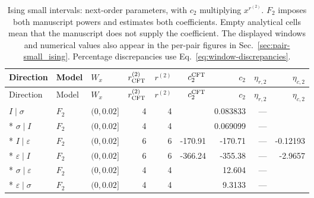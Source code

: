 \begingroup\setlength{\tabcolsep}{2pt}
\begin{longtable}{lllrrrrrr}
\caption{Ising small intervals: next-order parameters, with $c_2$ multiplying $x^{r^{(2)}}$. $F_2$ imposes both manuscript powers and estimates both coefficients. Empty analytical cells mean that the manuscript does not supply the coefficient. The displayed windows and numerical values also appear in the per-pair figures in Sec.~\ref{sec:pair-small_ising}. Percentage discrepancies use Eq.~\eqref{eq:window-discrepancies}.}
\label{tab:window-small_ising-second}\\\toprule
Direction & Model & $W_x$ & $r^{(2)}_{\rm CFT}$ & $r^{(2)}$ & $c_2^{\rm CFT}$ & $c_2$ & $\eta_{r,2}$ & $\eta_{c,2}$\\\midrule
\endfirsthead
\toprule
Direction & Model & $W_x$ & $r^{(2)}_{\rm CFT}$ & $r^{(2)}$ & $c_2^{\rm CFT}$ & $c_2$ & $\eta_{r,2}$ & $\eta_{c,2}$\\\midrule
\endhead
\bottomrule\endfoot
$I\mid \sigma$ & $F_2$ & $(0,0.02]$ & 4 & 4 &  & 0.083833 & --- & \\*
$\sigma\mid I$ & $F_2$ & $(0,0.02]$ & 4 & 4 &  & 0.069099 & --- & \\*
$I\mid \varepsilon$ & $F_2$ & $(0,0.02]$ & 6 & 6 & -170.91 & -170.71 & --- & -0.12193\\*
$\varepsilon\mid I$ & $F_2$ & $(0,0.02]$ & 6 & 6 & -366.24 & -355.38 & --- & -2.9657\\*
$\sigma\mid \varepsilon$ & $F_2$ & $(0,0.02]$ & 4 & 4 &  & 12.604 & --- & \\*
$\varepsilon\mid \sigma$ & $F_2$ & $(0,0.02]$ & 4 & 4 &  & 9.3133 & --- & \\
\end{longtable}
\endgroup
